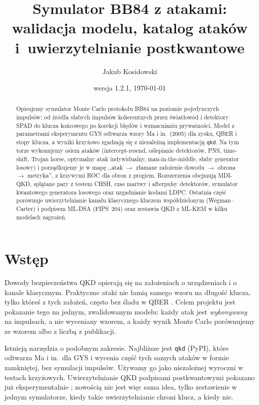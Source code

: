 \documentclass[11pt,a4paper]{article}
\title{Symulator BB84 z atakami:\\walidacja modelu, katalog ataków i~uwierzytelnianie postkwantowe}
\author{Jakub Kosidowski}
\date{wersja 1.2.1, \today}
\begin{document}
\maketitle

\begin{abstract}
Opisujemy symulator Monte Carlo protokołu BB84 na poziomie pojedynczych impulsów: od źródła słabych impulsów koherentnych przez światłowód i detektory SPAD do klucza końcowego po korekcji błędów i wzmacnianiu prywatności. Model z parametrami eksperymentu GYS odtwarza wzory Ma i in.\ (2005) dla zysku, QBER i stopy klucza, a wyniki krzyżowo zgadzają się z niezależną implementacją \texttt{qkd}. Na tym torze wykonujemy osiem ataków (intercept-resend, oślepianie detektorów, PNS, time-shift, Trojan horse, optymalny atak indywidualny, man-in-the-middle, słaby generator losowy) i porządkujemy je w mapę ,,atak $\to$ złamane założenie dowodu $\to$ obrona $\to$ metryka'', z krzywymi ROC dla obron z progiem. Rozszerzenia obejmują MDI-QKD, splątane pary z testem CHSH, czas martwy i afterpulsy detektorów, symulator kwantowego generatora losowego oraz uzgadnianie kodami LDPC. Ostatnia część porównuje uwierzytelnianie kanału klasycznego kluczem współdzielonym (Wegman--Carter) i podpisem ML-DSA (FIPS~204) oraz zestawia QKD z ML-KEM w kilku modelach zagrożeń.
\end{abstract}

\section{Wstęp}

Dowody bezpieczeństwa QKD \cite{shor2000simple,gllp2004,scarani2009security} opierają się na założeniach o urządzeniach i o kanale klasycznym. Praktyczne ataki \cite{brassard2000limitations,lydersen2010hacking,zhao2008quantum,gisin2006trojan} nie łamią samego wzoru na długość klucza, tylko któreś z tych założeń, często bez śladu w QBER \cite{xu2020secure}. Celem projektu jest pokazanie tego na jednym, zwalidowanym modelu: każdy atak jest \emph{wykonywany} na impulsach, a nie wyceniany wzorem, a każdy wynik Monte Carlo porównujemy ze wzorem albo z liczbą z publikacji.

Istnieją narzędzia o podobnym zakresie. Najbliższe jest \texttt{qkd} (PyPI), które odtwarza Ma i in.\ dla GYS i wycenia część tych samych ataków w formie zamkniętej, bez symulacji impulsów. Używamy go jako niezależnej wyroczni w testach krzyżowych. Uwierzytelnianie QKD podpisami postkwantowymi pokazano już eksperymentalnie \cite{wang2021experimental}; nowością nie jest więc sama idea, tylko zestawienie w jednym symulatorze, kiedy takie uwierzytelnianie chroni klucz, a kiedy nie.
\end{document}
